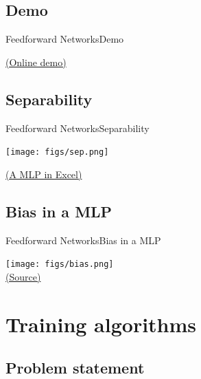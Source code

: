 \documentclass[10pt,compress]{beamer} %
\begin{document}
\subsection{Demo}
\begin{frame}{Feedforward Networks}{Demo}
    \begin{center}
	\href{http://playground.tensorflow.org/}{(Online demo)}
    \end{center}
\end{frame}

\subsection{Separability}
\begin{frame}{Feedforward Networks}{Separability}
    \begin{center}
	    \texttt{[image: figs/sep.png]}
    \end{center}

	\centering \href{https://github.com/dfbarrero/aiCourse/raw/master/ann/artificialNeuron.xlsx}{(A MLP in Excel)}
\end{frame}

\subsection{Bias in a MLP}
\begin{frame}{Feedforward Networks}{Bias in a MLP}
    \begin{center}
	    \texttt{[image: figs/bias.png]}\\
		\tiny \href{https://scikit-learn.org/stable/modules/neural\_networks\_supervised.html}{(Source)}
    \end{center}
\end{frame}


\section{Training algorithms}
\subsection{Problem statement}
\end{document}
